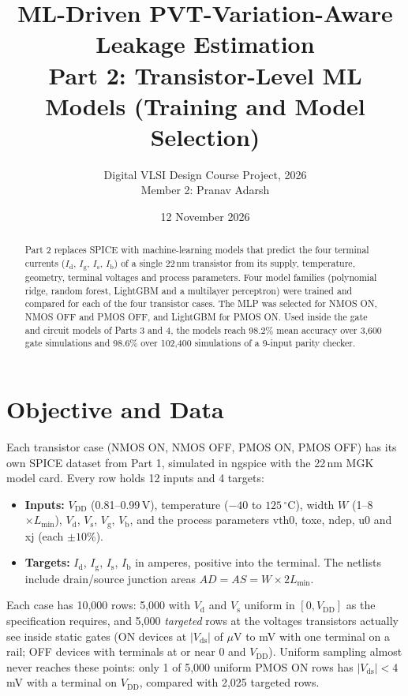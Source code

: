 \documentclass[11pt,a4paper]{article}
\title{\textbf{ML-Driven PVT-Variation-Aware Leakage Estimation}\\[4pt]
\large Part 2: Transistor-Level ML Models (Training and Model Selection)}
\author{Digital VLSI Design Course Project, 2026\\ Member 2: Pranav Adarsh}
\date{12 November 2026}
\newcommand{\Id}{I_\mathrm{d}}
\newcommand{\Ig}{I_\mathrm{g}}
\newcommand{\Is}{I_\mathrm{s}}
\newcommand{\Ib}{I_\mathrm{b}}
\newcommand{\Vds}{V_\mathrm{ds}}
\newcommand{\VDD}{V_\mathrm{DD}}
\begin{document}
\maketitle

\begin{abstract}
Part 2 replaces SPICE with machine-learning models that predict the four terminal currents
($\Id$, $\Ig$, $\Is$, $\Ib$) of a single 22\,nm transistor from its supply, temperature, geometry,
terminal voltages and process parameters. Four model families (polynomial ridge, random forest,
LightGBM and a multilayer perceptron) were trained and compared for each of the four transistor
cases. The MLP was selected for NMOS ON, NMOS OFF and PMOS OFF, and LightGBM for PMOS ON. Used
inside the gate and circuit models of Parts 3 and 4, the models reach 98.2\% mean accuracy over
3,600 gate simulations and 98.6\% over 102,400 simulations of a 9-input parity checker.
\end{abstract}

\section{Objective and Data}
Each transistor case (NMOS ON, NMOS OFF, PMOS ON, PMOS OFF) has its own SPICE dataset from Part 1,
simulated in ngspice with the 22\,nm MGK model card. Every row holds 12 inputs and 4 targets:
\begin{itemize}
  \item \textbf{Inputs:} $\VDD$ (0.81--0.99\,V), temperature ($-40$ to $125\,^\circ$C), width $W$
        (1--8\,$\times L_\mathrm{min}$), $V_\mathrm{d}$, $V_\mathrm{s}$, $V_\mathrm{g}$, $V_\mathrm{b}$,
        and the process parameters vth0, toxe, ndep, u0 and xj (each $\pm10\%$).
  \item \textbf{Targets:} $\Id$, $\Ig$, $\Is$, $\Ib$ in amperes, positive into the terminal. The
        netlists include drain/source junction areas $AD = AS = W \times 2L_\mathrm{min}$.
\end{itemize}
Each case has 10,000 rows: 5,000 with $V_\mathrm{d}$ and $V_\mathrm{s}$ uniform in $[0,\VDD]$ as the
specification requires, and 5,000 \emph{targeted} rows at the voltages transistors actually see
inside static gates (ON devices at $|\Vds|$ of $\mu$V to mV with one terminal on a rail;
OFF devices with terminals at or near 0 and $\VDD$). Uniform sampling almost never reaches these
points: only 1 of 5,000 uniform PMOS ON rows has $|\Vds| < 4$\,mV with a terminal on $\VDD$,
compared with 2,025 targeted rows.
\end{document}
